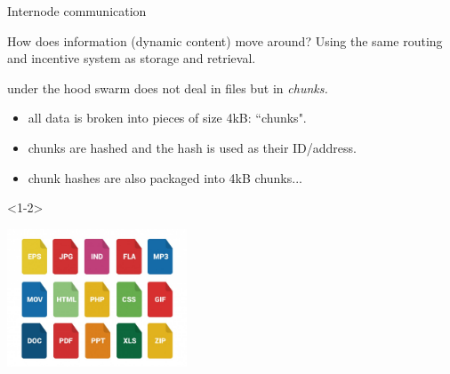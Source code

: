 \documentclass{beamer}
\begin{document}
\begin{frame}
 \tableofcontents[subsectionstyle=shaded/shaded,subsubsectionstyle=hide/hide]
\end{frame}

\begin{section}{Internode communication}

\begin{frame}
 \begin{block}{How does information (dynamic content) move around?}
 Using the same routing and incentive system as storage and retrieval.
 \end{block}
\end{frame}

\begin{frame}[t]{}
\begin{overlayarea}{\textwidth}{10cm}
under the hood swarm does not deal in files but in \emph{chunks.}

\begin{itemize}
 \item<2-> all data is broken into pieces of size 4kB: ``chunks".
 \item<4-> chunks are hashed and the hash is used as their ID/address.
 \item<5-> chunk hashes are also packaged into 4kB chunks...
\end{itemize}

\begin{onlyenv}<1-2>
 \begin{center}
  \includegraphics[width=0.4\textwidth]{devcon-files.jpg}
 \end{center}
\end{onlyenv}

 \begin{center}
\end{center}
\end{overlayarea}
\end{frame}
\end{section}
\end{document}
